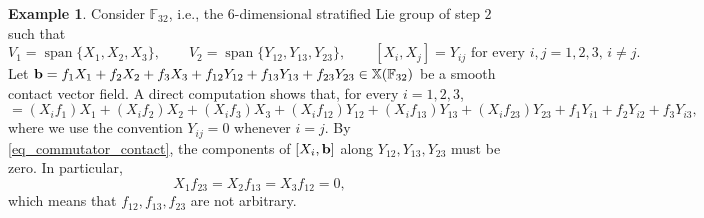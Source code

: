 \documentclass[11pt]{amsart}
\newcommand{\hhh}{{\mathcal{H}}}
\newcommand{\bb}{{\bf {b}}} %
\DeclareMathOperator{\spann}{span}
\theoremstyle{plain}
\theoremstyle{definition}
\newtheorem{example}[theorem]{Example}
\theoremstyle{remark}
\numberwithin{equation}{section}
\begin{document}
\begin{example}
Consider $\mathbb{F}_{32}$, i.e., the $6$-dimensional stratified Lie group of step $2$ such that
\begin{equation*}
V_1=\spann\{X_1,X_2,X_3\}, \qquad V_2=\spann\{Y_{12},Y_{13},Y_{23}\},\qquad [X_i,X_j]=Y_{ij}\text{ for every $i,j=1,2,3$, $i \neq j$.}
\end{equation*}
Let $\bb=f_1 X_1+f_2 X_2+f_3 X_3+f_{12}Y_{12}+f_{13}Y_{13}+f_{23}Y_{23} \in \mathbb{X}(\mathbb{F}_{32})$ be a smooth contact vector field. A direct computation shows that, for every $i=1,2,3$,
\begin{equation*}
[X_i,\bb]=(X_i f_1) X_1+(X_i f_2) X_2+(X_i f_3) X_3+(X_i f_{12}) Y_{12}+(X_i f_{13}) Y_{13}+(X_i f_{23}) Y_{23}+f_1 Y_{i1}+f_2 Y_{i2}+f_3 Y_{i3},
\end{equation*}
where we use the convention $Y_{ij}=0$ whenever $i=j$. By \eqref{eq_commutator_contact}, the components of $[X_i,\bb]$ along $Y_{12},Y_{13},Y_{23}$ must be zero. In particular,
\begin{equation*}
X_1 f_{23}=X_2 f_{13}=X_3 f_{12}=0,
\end{equation*}
which means that $f_{12},f_{13},f_{23}$ are not arbitrary.
\end{example}
\end{document}
